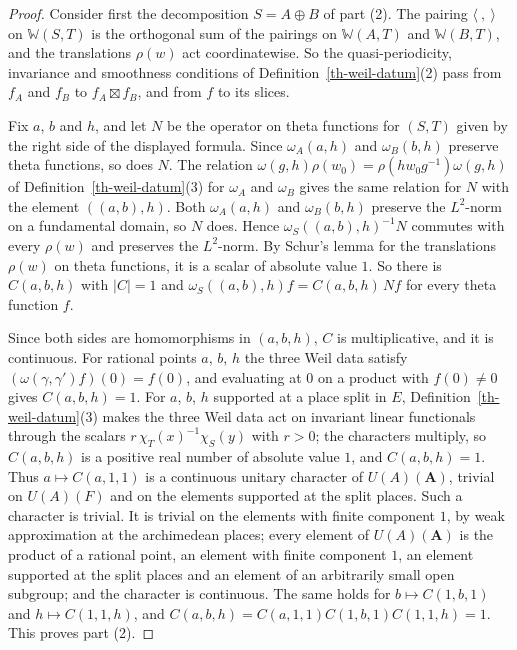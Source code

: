 \begin{proof}
Consider first the decomposition $S=A\oplus B$ of part (2). The pairing
$\langle\ ,\ \rangle$ on $\mathbb W(S,T)$ is the orthogonal sum of the pairings
on $\mathbb W(A,T)$ and $\mathbb W(B,T)$, and the translations $\rho(w)$ act
coordinatewise. So the quasi-periodicity, invariance and smoothness conditions
of Definition~\ref{th-weil-datum}(2) pass from $f_A$ and $f_B$ to
$f_A\boxtimes f_B$, and from $f$ to its slices.

Fix $a$, $b$ and $h$, and let $N$ be the operator on theta functions for $(S,T)$
given by the right side of the displayed formula. Since $\omega_A(a,h)$ and
$\omega_B(b,h)$ preserve theta functions, so does $N$. The relation
$\omega(g,h)\rho(w_0)=\rho(hw_0g^{-1})\omega(g,h)$ of
Definition~\ref{th-weil-datum}(3) for $\omega_A$ and $\omega_B$ gives the same
relation for $N$ with the element $((a,b),h)$. Both $\omega_A(a,h)$ and
$\omega_B(b,h)$ preserve the $L^2$-norm on a fundamental domain, so $N$ does.
Hence $\omega_S((a,b),h)^{-1}N$ commutes with every $\rho(w)$ and preserves the
$L^2$-norm. By Schur's lemma for the translations $\rho(w)$ on theta functions,
it is a scalar of absolute value $1$. So there is $C(a,b,h)$ with $|C|=1$ and
$\omega_S((a,b),h)f=C(a,b,h)\,Nf$ for every theta function $f$.

Since both sides are homomorphisms in $(a,b,h)$, $C$ is multiplicative, and it
is continuous. For rational points $a$, $b$, $h$ the three Weil data satisfy
$(\omega(\gamma,\gamma')f)(0)=f(0)$, and evaluating at $0$ on a product with
$f(0)\neq0$ gives $C(a,b,h)=1$. For $a$, $b$, $h$ supported at a place split in
$E$, Definition~\ref{th-weil-datum}(3) makes the three Weil data act on
invariant linear functionals through the scalars
$r\,\chi_T(x)^{-1}\chi_S(y)$ with $r>0$; the characters multiply, so
$C(a,b,h)$ is a positive real number of absolute value $1$, and $C(a,b,h)=1$.
Thus $a\mapsto C(a,1,1)$ is a continuous unitary character of
$U(A)(\mathbf A)$, trivial on $U(A)(F)$ and on the elements supported at the
split places. Such a character is trivial. It is trivial on the elements with
finite component $1$, by weak approximation at the archimedean places; every
element of $U(A)(\mathbf A)$ is the product of a rational point, an element with
finite component $1$, an element supported at the split places and an element
of an arbitrarily small open subgroup; and the character is continuous. The
same holds for $b\mapsto C(1,b,1)$ and
$h\mapsto C(1,1,h)$, and
$C(a,b,h)=C(a,1,1)C(1,b,1)C(1,1,h)=1$. This proves part (2).


\end{proof}
